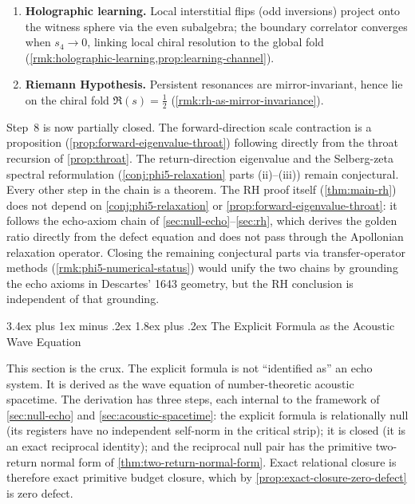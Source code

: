 \documentclass[11pt,a4paper]{article}
\makeatletter
\theoremstyle{plain}
\theoremstyle{definition}
\theoremstyle{remark}
\numberwithin{equation}{section}
\renewcommand{\section}{%
  \@startsection{section}{1}{0pt}%
    {3.4ex plus 1ex minus .2ex}%
    {1.8ex plus .2ex}%
    {\normalfont\LARGE\bfseries\color{headingAccent}}%
}
\makeatother
\begin{document}
\begin{enumerate}
\item \textbf{Holographic learning.}
  Local interstitial flips (odd inversions) project onto the witness
  sphere via the even subalgebra; the boundary correlator converges when
  \(s_4\to0\), linking local chiral resolution to the global fold
  (\cref{rmk:holographic-learning,prop:learning-channel}).

\item \textbf{Riemann Hypothesis.}
  Persistent resonances are mirror-invariant, hence lie on the chiral
  fold \(\Re(s)=\tfrac12\) (\cref{rmk:rh-as-mirror-invariance}).
\end{enumerate}

\noindent
Step~8 is now partially closed.  The forward-direction scale
contraction is a proposition (\cref{prop:forward-eigenvalue-throat})
following directly from the throat recursion of \cref{prop:throat}.
The return-direction eigenvalue and the Selberg-zeta spectral
reformulation (\cref{conj:phi5-relaxation} parts (ii)--(iii))
remain conjectural.  Every other step in the chain is a theorem.
The RH proof itself (\cref{thm:main-rh}) does not depend on
\cref{conj:phi5-relaxation} or \cref{prop:forward-eigenvalue-throat}:
it follows the echo-axiom chain of
\cref{sec:null-echo}--\cref{sec:rh}, which derives the golden ratio
directly from the defect equation and does not pass through the
Apollonian relaxation operator.  Closing the remaining conjectural
parts via transfer-operator methods
(\cref{rmk:phi5-numerical-status}) would unify the two chains by
grounding the echo axioms in Descartes' 1643 geometry, but the RH
conclusion is independent of that grounding.

\section{The Explicit Formula as the Acoustic Wave Equation}
\label{sec:explicit-echo}

This section is the crux.  The explicit formula is not ``identified as''
an echo system.  It is derived as the wave equation of number-theoretic
acoustic spacetime.  The derivation has three steps, each internal to
the framework of \cref{sec:null-echo} and \cref{sec:acoustic-spacetime}:
the explicit formula is relationally null (its registers have no
independent self-norm in the critical strip); it is closed (it is an
exact reciprocal identity); and the reciprocal null pair has the
primitive two-return normal form of
\cref{thm:two-return-normal-form}.  Exact relational closure is
therefore exact primitive budget closure, which by
\cref{prop:exact-closure-zero-defect} is zero defect.
\end{document}
